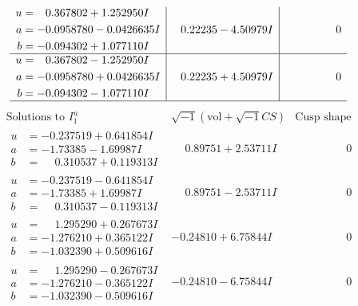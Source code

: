 \documentclass[1p]{elsarticle_modified}
\theoremstyle{definition}
\newcommand{\I}{\sqrt{-1}}
\begin{document}
$$\begin{array}{c|c|c}
\begin{aligned}
u &= \phantom{-}0.367802 + 1.252950 I \\
a &= -0.0958780 - 0.0426635 I \\
b &= -0.094302 + 1.077110 I\end{aligned}
 & \phantom{-}0.22235 - 4.50979 I & \phantom{-0.000000 } 0 \\ \hline\begin{aligned}
u &= \phantom{-}0.367802 - 1.252950 I \\
a &= -0.0958780 + 0.0426635 I \\
b &= -0.094302 - 1.077110 I\end{aligned}
 & \phantom{-}0.22235 + 4.50979 I & \phantom{-0.000000 } 0\\
 \hline 
 \end{array}$$\newpage$$\begin{array}{c|c|c}  
\text{Solutions to }I^u_{1}& \I (\text{vol} + \sqrt{-1}CS) & \text{Cusp shape}\\
 \hline 
\begin{aligned}
u &= -0.237519 + 0.641854 I \\
a &= -1.73385 - 1.69987 I \\
b &= \phantom{-}0.310537 + 0.119313 I\end{aligned}
 & \phantom{-}0.89751 + 2.53711 I & \phantom{-0.000000 } 0 \\ \hline\begin{aligned}
u &= -0.237519 - 0.641854 I \\
a &= -1.73385 + 1.69987 I \\
b &= \phantom{-}0.310537 - 0.119313 I\end{aligned}
 & \phantom{-}0.89751 - 2.53711 I & \phantom{-0.000000 } 0 \\ \hline\begin{aligned}
u &= \phantom{-}1.295290 + 0.267673 I \\
a &= -1.276210 + 0.365122 I \\
b &= -1.032390 + 0.509616 I\end{aligned}
 & -0.24810 + 6.75844 I & \phantom{-0.000000 } 0 \\ \hline\begin{aligned}
u &= \phantom{-}1.295290 - 0.267673 I \\
a &= -1.276210 - 0.365122 I \\
b &= -1.032390 - 0.509616 I\end{aligned}
 & -0.24810 - 6.75844 I & \phantom{-0.000000 } 0 \\ \hline\begin{aligned}

\end{aligned}
\end{array}$$
\end{document}
